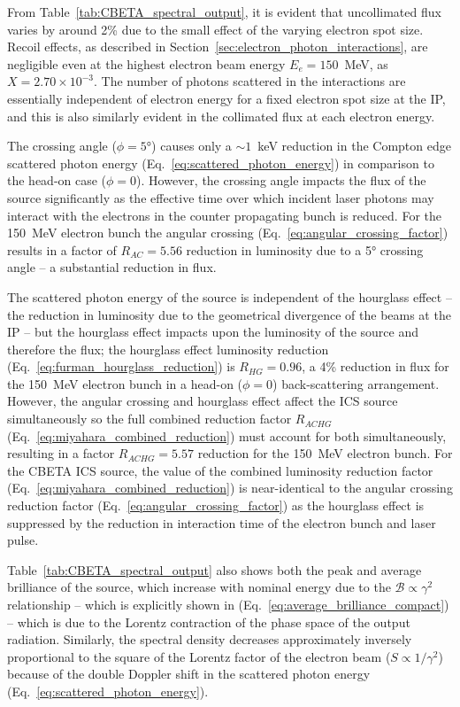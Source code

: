 \documentclass[../main.tex]{subfiles}
\begin{document}
From Table~\ref{tab:CBETA_spectral_output}, it is evident that uncollimated flux varies by around 2\% due to the small effect of the varying electron spot size. Recoil effects, as described in Section~\ref{sec:electron_photon_interactions}, are negligible even at the highest electron beam energy $E_{e} = 150$~\si{\mega\electronvolt}, as $X = 2.70\times 10^{-3}$. The number of photons scattered in the interactions are essentially independent of electron energy for a fixed electron spot size at the IP, and this is also similarly evident in the collimated flux at each electron energy. 

The crossing angle ($\phi=5$\si{\degree}) causes only a $\sim 1$~\si{\kilo\electronvolt} reduction in the Compton edge scattered photon energy (Eq.~\ref{eq:scattered_photon_energy}) in comparison to the head-on case ($\phi = 0$). However, the crossing angle impacts the flux of the source significantly as the effective time over which incident laser photons may interact with the electrons in the counter propagating bunch is reduced. For the 150~\si{\mega\electronvolt} electron bunch the angular crossing (Eq.~\ref{eq:angular_crossing_factor}) results in a factor of $R_{AC} = 5.56$ reduction in luminosity due to a 5\si{\degree} crossing angle  -- a substantial reduction in flux. 

The scattered photon energy of the source is independent of the hourglass effect -- the reduction in luminosity due to the geometrical divergence of the beams at the IP \cite{furman1991hourglass} -- but the hourglass effect impacts upon the luminosity of the source and therefore the flux; the hourglass effect luminosity reduction (Eq.~\ref{eq:furman_hourglass_reduction}) is $R_{HG} = 0.96$, a 4\% reduction in flux for the 150~\si{\mega\electronvolt} electron bunch in a head-on ($\phi=0$) back-scattering arrangement. However, the angular crossing and hourglass effect affect the ICS source simultaneously so the full combined reduction factor $R_{ACHG}$ (Eq.~\ref{eq:miyahara_combined_reduction}) must account for both simultaneously, resulting in a factor $R_{ACHG} = 5.57$ reduction for the 150~\si{\mega\electronvolt} electron bunch. For the CBETA ICS source, the value of the combined luminosity reduction factor (Eq.~\ref{eq:miyahara_combined_reduction}) is  near-identical to the angular crossing reduction factor (Eq.~\ref{eq:angular_crossing_factor}) as the hourglass effect is suppressed by the reduction in interaction time of the electron bunch and laser pulse. 

Table~\ref{tab:CBETA_spectral_output} also shows both the peak and average brilliance of the source, which increase with nominal energy due to the $\mathcal{B} \propto \gamma^{2}$ relationship -- which is explicitly shown in (Eq.~\ref{eq:average_brilliance_compact}) -- which is due to the Lorentz contraction of the phase space of the output radiation.  Similarly, the spectral density decreases approximately inversely proportional to the square of the Lorentz factor of the electron beam ($S \propto 1/\gamma^{2}$) because of the double Doppler shift in the scattered photon energy (Eq.~\ref{eq:scattered_photon_energy}). 
\end{document}
